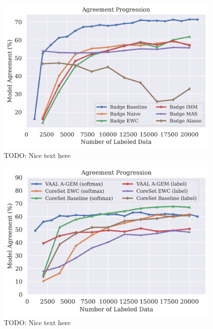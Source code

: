 \begin{figure}[h]
    \centering
    \includegraphics[width=0.8\linewidth]{images/results_CALMS/cifar_softmax_badge.png}
    \caption[Agreement Comparison for Model Stealing on MNIST using the softmax output and the Active Learning strategy Badge]{TODO: Nice text here}
    \label{fig:CALMSMNISTSoftmaxBadge}
\end{figure}

\begin{figure}[h]
    \centering
    \includegraphics[width=0.8\linewidth]{images/results_CALMS/cifar_vaal_agem.png}
    \caption[Agreement Comparison for Model Stealing on CIFAR-10 using VAAL and AGEM]{TODO: Nice text here}
    \label{fig:CALMScifarVAAL_AGEM}
\end{figure}

